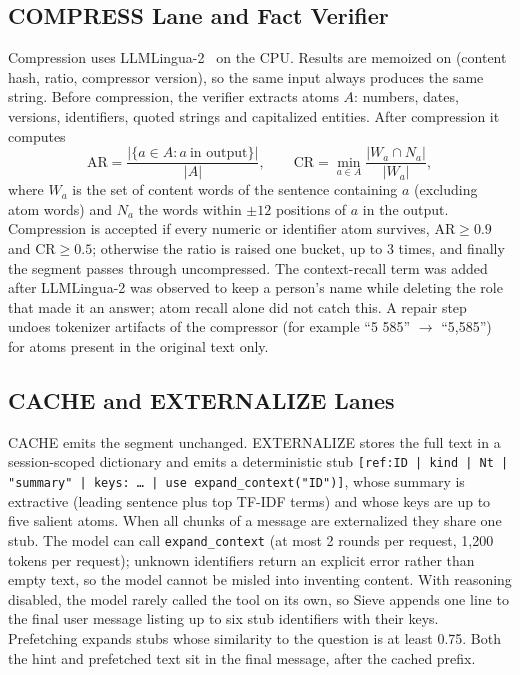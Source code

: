 \documentclass[journal]{IEEEtran}
\begin{document}
\subsection{COMPRESS Lane and Fact Verifier}
Compression uses LLMLingua-2~\cite{pan2024llmlingua2} on the CPU. Results are memoized on (content hash, ratio, compressor
version), so the same input always produces the same string. Before compression, the verifier extracts atoms $A$: numbers, dates,
versions, identifiers, quoted strings and capitalized entities. After compression it computes
\begin{equation}
\mathrm{AR}=\frac{|\{a\in A: a\ \text{in output}\}|}{|A|},\qquad
\mathrm{CR}=\min_{a\in A}\frac{|W_a\cap N_a|}{|W_a|},
\label{eq:verify}
\end{equation}
where $W_a$ is the set of content words of the sentence containing $a$ (excluding atom words) and $N_a$ the words within $\pm12$
positions of $a$ in the output. Compression is accepted if every numeric or identifier atom survives, $\mathrm{AR}\ge0.9$ and
$\mathrm{CR}\ge0.5$; otherwise the ratio is raised one bucket, up to 3 times, and finally the segment passes through
uncompressed. The context-recall term was added after LLMLingua-2 was observed to keep a person's name while deleting the role
that made it an answer; atom recall alone did not catch this. A repair step undoes tokenizer artifacts of the compressor (for
example ``5 585'' $\rightarrow$ ``5,585'') for atoms present in the original text only.

\subsection{CACHE and EXTERNALIZE Lanes}
CACHE emits the segment unchanged. EXTERNALIZE stores the full text in a session-scoped dictionary and emits a deterministic stub
\texttt{[ref:ID | kind | Nt | "summary" | keys: \dots{} | use expand\_context("ID")]}, whose summary is extractive (leading sentence
plus top TF-IDF terms) and whose keys are up to five salient atoms. When all chunks of a message are externalized they share one
stub. The model can call \texttt{expand\_context} (at most 2 rounds per request, 1,200 tokens per request); unknown
identifiers return an explicit error rather than empty text, so the model cannot be misled into inventing content. With reasoning
disabled, the model rarely called the tool on its own, so Sieve appends one line to the final user message listing up to six stub
identifiers with their keys. Prefetching expands stubs whose similarity to the question is at least 0.75. Both the hint
and prefetched text sit in the final message, after the cached prefix.
\end{document}
